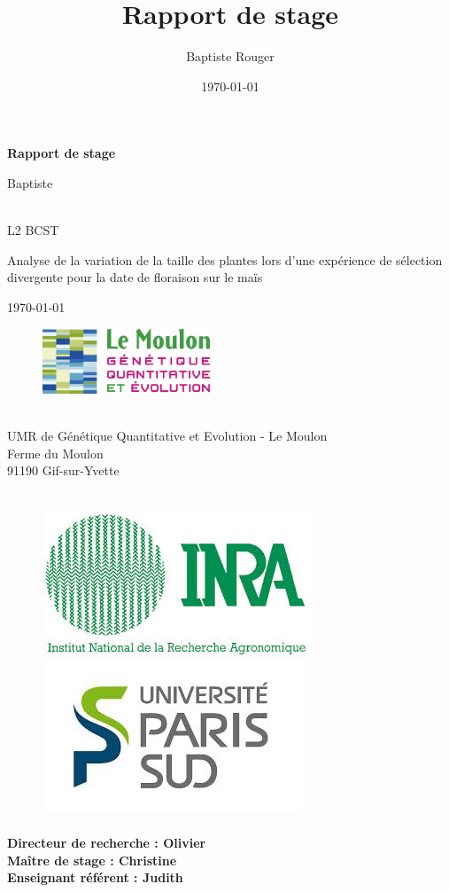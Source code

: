 \documentclass[12pt,a4paper]{article}
\author{Baptiste Rouger}
\title{Rapport de stage}
\date{\today}
\begin{document}
	\begin{titlepage}
		
		\begin{center}
			\vfill
			
			{\Huge \textbf{Rapport de stage}}
			
			\vfill
			
			{\LARGE Baptiste }
			
			~\\L2 BCST
			
			\vfill
			
			{\Huge Analyse de la variation de la taille des plantes lors d'une expérience de sélection divergente pour la date de floraison sur le maïs}
			
			\vfill
			
			{\large\today}
			
			\vfill
			\end{center}
			
			\begin{figure}
				\includegraphics[width=5cm]{logo.jpg}
			\end{figure} ~\\ %
			UMR de Génétique Quantitative et Evolution - Le Moulon\\
			Ferme du Moulon\\
			91190 Gif-sur-Yvette \\ \\
			
			\begin{figure}[h]
				\centering
				\includegraphics[width = 4 cm]{inra.jpg}
				\includegraphics[width = 4 cm]{upsud.jpg}
			\end{figure}
			
			\paragraph*{Directeur de recherche : Olivier  \\
			Maître de stage : Christine \\
			Enseignant référent : Judith  }
			\vfill
	\end{titlepage}
	
\end{document}
